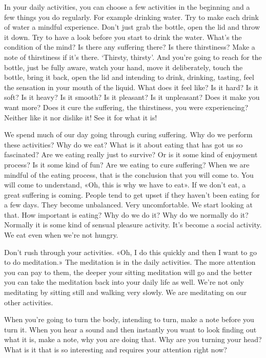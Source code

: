 \documentclass[letterpaper,10pt,english]{sphinxmanual}
\begin{document}
\sphinxAtStartPar
In your daily activities, you can choose a few activities in the beginning and a few things you do regularly. For example drinking water. Try to
make each drink of water a mindful experience. Don’t just grab the bottle,
open the lid and throw it down. Try to have a look before you start to drink
the water. What’s the condition of the mind? Is there any suffering there? Is
there  thirstiness?  Make  a  note  of  thirstiness  if  it’s  there.  ‘Thirsty,  thirsty’.
And  you’re  going  to  reach  for  the  bottle,  just  be  fully  aware,  watch  your
hand, move it deliberately, touch the bottle, bring it back, open the lid and
intending to drink, drinking, tasting, feel the sensation in your mouth of the
liquid. What does it feel like? Is it hard? Is it soft? Is it heavy? Is it smooth?
Is it pleasant? Is it unpleasant? Does it make you want more? Does it cure the
suffering, the thirstiness, you were experiencing? Neither like it nor dislike
it! See it for what it is!

\sphinxAtStartPar
We spend much of our day going through curing suffering. Why do we
perform these activities? Why do we eat? What is it about eating that has got
us so fascinated? Are we eating really just to survive? Or is it some kind of
enjoyment process? Is it some kind of fun? Are we eating to cure suffering?
When we are mindful of the eating process, that is the conclusion that you
will come to. You will come to understand, «Oh, this is why we have to eat».
If we don’t eat, a great suffering is coming. People tend to get upset if they
haven’t been eating for a few days. They become unbalanced. Very uncomfortable. We start looking at that. How important is eating? Why do we do
  it? Why do we normally do it? Normally it is some kind of sensual pleasure
activity. It’s become a social activity. We eat even when we’re not hungry.

\sphinxAtStartPar
Don’t rush through your activities. «Oh, I do this quickly and then I
want to go to do meditation.» The meditation is in the daily activities. The
more attention you can pay to them, the deeper your sitting meditation will
go  and  the  better  you  can  take  the  meditation  back  into  your  daily  life  as
well. We’re not only meditating by sitting still and walking very slowly. We
are meditating on our other activities.

\sphinxAtStartPar
When  you’re  going  to  turn  the  body,  intending  to  turn,  make  a  note
before you turn it. When you hear a sound and then instantly you want to
look finding out what it is, make a note, why you are doing that. Why are
you  turning  your  head? What  is  it  that  is  so  interesting  and  requires  your
attention right now?
\end{document}
